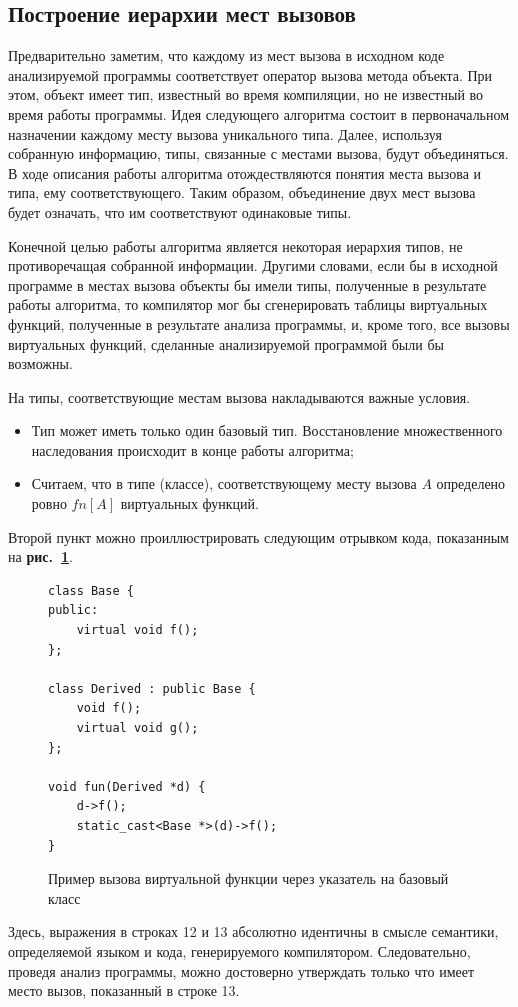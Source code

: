 \documentclass[a4paper,12pt,russian]{article}
\newcommand{\picref}[1]{\textbf{рис.~\ref{#1}}}
\newcommand{\code}[1]{\textsf{#1}}
\begin{document}
\subsection{Построение иерархии мест вызовов}
Предварительно заметим, что каждому из мест вызова в исходном коде анализируемой программы соответствует оператор вызова метода объекта.
При этом, объект имеет тип, известный во время компиляции, но не известный во время работы программы.
Идея следующего алгоритма состоит в первоначальном назначении каждому месту вызова уникального типа.
Далее, используя собранную информацию, типы, связанные с местами вызова, будут объединяться.
В ходе описания работы алгоритма отождествляются понятия места вызова и типа, ему соответствующего.
Таким образом, объединение двух мест вызова будет означать, что им соответствуют одинаковые типы.

Конечной целью работы алгоритма является некоторая иерархия типов, не противоречащая собранной информации.
Другими словами, если бы в исходной программе в местах вызова объекты бы имели типы, полученные в результате работы алгоритма,
то компилятор мог бы сгенерировать таблицы виртуальных функций, полученные в результате анализа программы, и, кроме того, все вызовы виртуальных функций,
сделанные анализируемой программой были бы возможны.

На типы, соответствующие местам вызова накладываются важные условия.
\begin{itemize}
\item Тип может иметь только один базовый тип. Восстановление множественного наследования происходит в конце работы алгоритма;
\item Считаем, что в типе (классе), соответствующему месту вызова $A$ определено ровно $fn[A]$ виртуальных функций.
\end{itemize}
Второй пункт можно проиллюстрировать следующим отрывком кода, показанным на \picref{min_vsize_ex_lst}.
\begin{figure}
\begin{lstlisting}
class Base {
public:
    virtual void f();
};

class Derived : public Base {
    void f();
    virtual void g();
};

void fun(Derived *d) {
    d->f();
    static_cast<Base *>(d)->f();
}
\end{lstlisting}
\caption{Пример вызова виртуальной функции через указатель на базовый класс}
\label{min_vsize_ex_lst}
\end{figure}

Здесь, выражения в строках \code{12} и \code{13} абсолютно идентичны в смысле семантики, определяемой языком и кода, генерируемого компилятором.
Следовательно, проведя анализ программы, можно достоверно утверждать только что имеет место вызов, показанный в строке \code{13}.
\end{document}
